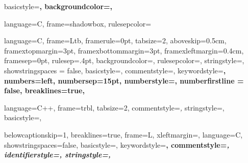 {
  basicstyle=\scriptsize\bf\ttfamily,
  backgroundcolor=\color{gray75},
}

{
  language=C,
  frame=shadowbox, 
  rulesepcolor=\color{blue}
}

{
  language=C,
  frame=Ltb,
  framerule=0pt,
  tabsize=2,
  aboveskip=0.5cm,
  framextopmargin=3pt,
  framexbottommargin=3pt,
  framexleftmargin=0.4cm,
  framesep=0pt,
  rulesep=.4pt,
  backgroundcolor=\color{gray97},
  rulesepcolor=\color{black},
  stringstyle=\ttfamily,
  showstringspaces = false,
  basicstyle=\footnotesize\ttfamily,
  commentstyle=\color{gray45},
  keywordstyle=\bfseries,
  numbers=left,
  numbersep=15pt,
  numberstyle=\tiny,
  numberfirstline = false,
  breaklines=true,
}	

{
  language=C++,
  frame=trbl,
  tabsize=2,
  commentstyle=\textit,
  stringstyle=\ttfamily, 
  basicstyle=\small,
}	

{
  belowcaptionskip=1\baselineskip,
  breaklines=true,
  frame=L,
  xleftmargin=\parindent,
  language=C,
  showstringspaces=false,
  basicstyle=\footnotesize\ttfamily,
  keywordstyle=\bfseries\color{green!40!black},
  commentstyle=\itshape\color{purple!40!black},
  identifierstyle=\color{blue},
  stringstyle=\color{orange},
}



\usepackage{sidecap}

